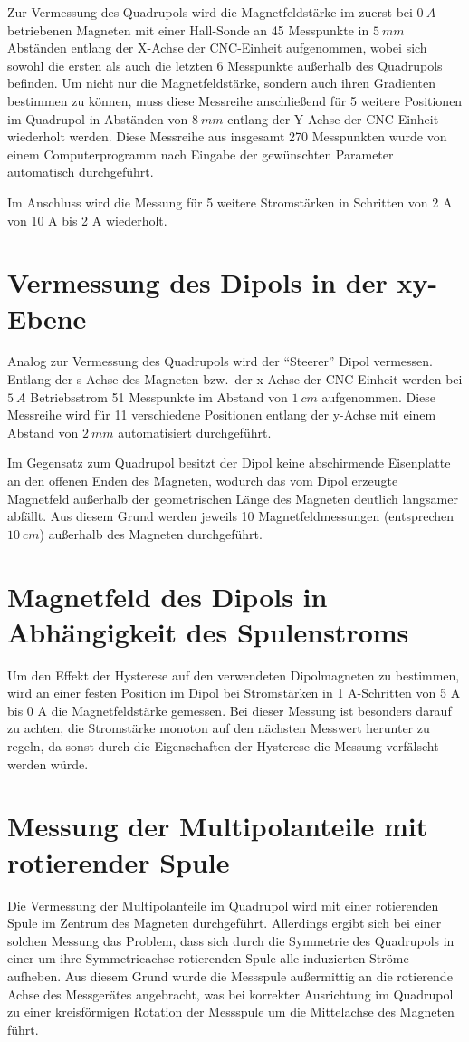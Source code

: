 \documentclass[bigchapter,colorback,accentcolor=tud4b,linedtoc,11pt]{tudreport}
\begin{document}
Zur Vermessung des Quadrupols wird die Magnetfeldstärke im zuerst bei $0~A$ betriebenen Magneten mit einer Hall-Sonde an 45 Messpunkte in $5~mm$ Abständen entlang der X-Achse der CNC-Einheit aufgenommen, wobei sich sowohl die ersten als auch die letzten 6 Messpunkte außerhalb des Quadrupols befinden. Um nicht nur die Magnetfeldstärke, sondern auch ihren Gradienten bestimmen zu können, muss diese Messreihe anschließend für 5 weitere Positionen im Quadrupol in Abständen von $8~mm$ entlang der Y-Achse der CNC-Einheit wiederholt werden. Diese Messreihe aus insgesamt 270 Messpunkten wurde von einem Computerprogramm nach Eingabe der gewünschten Parameter automatisch durchgeführt.

Im Anschluss wird die Messung für 5 weitere Stromstärken in Schritten von 2 A von 10 A bis 2 A wiederholt.

\section{Vermessung des Dipols in der xy-Ebene}
Analog zur Vermessung des Quadrupols wird der "`Steerer"' Dipol vermessen. Entlang der s-Achse des Magneten bzw.\ der x-Achse der CNC-Einheit werden bei $5~A$ Betriebsstrom 51 Messpunkte im Abstand von $1~cm$ aufgenommen. Diese Messreihe wird für 11 verschiedene Positionen entlang der y-Achse mit einem Abstand von $2~mm$ automatisiert durchgeführt.

Im Gegensatz zum Quadrupol besitzt der Dipol keine abschirmende Eisenplatte an den offenen Enden des Magneten, wodurch das vom Dipol erzeugte Magnetfeld außerhalb der geometrischen Länge des Magneten deutlich langsamer abfällt. Aus diesem Grund werden jeweils 10 Magnetfeldmessungen (entsprechen $10~cm$) außerhalb des Magneten durchgeführt.

\section{Magnetfeld des Dipols in Abhängigkeit des Spulenstroms}

Um den Effekt der Hysterese auf den verwendeten Dipolmagneten zu bestimmen, wird an einer festen Position im Dipol bei Stromstärken in 1 A-Schritten von 5 A bis 0 A die Magnetfeldstärke gemessen. Bei dieser Messung ist besonders darauf zu achten, die Stromstärke monoton auf den nächsten Messwert herunter zu regeln, da sonst durch die Eigenschaften der Hysterese die Messung verfälscht werden würde.

\section{Messung der Multipolanteile mit rotierender Spule}
Die Vermessung der Multipolanteile im Quadrupol wird mit einer rotierenden Spule im Zentrum des Magneten durchgeführt. Allerdings ergibt sich bei einer solchen Messung das Problem, dass sich durch die Symmetrie des Quadrupols in einer um ihre Symmetrieachse rotierenden Spule alle induzierten Ströme aufheben. Aus diesem Grund wurde die Messspule außermittig an die rotierende Achse des Messgerätes angebracht, was bei korrekter Ausrichtung im Quadrupol zu einer kreisförmigen Rotation der Messspule um die Mittelachse des Magneten führt.
\end{document}
